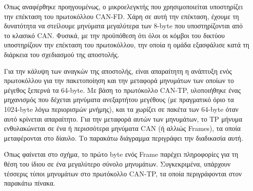 \documentclass[a4paper,nobib,justified]{tufte-book}
\begin{document}
Όπως αναφέρθηκε προηγουμένως, ο μικροελεγκτής που χρησιμοποιείται υποστηρίζει την επέκταση του πρωτοκόλλου CAN-FD. Χάρη σε αυτή την επέκταση, έχουμε τη δυνατότητα να στείλουμε μηνύματα μεγαλύτερα των 8-byte που υποστηρίζονται από το κλασικό CAN. Φυσικά, με την προϋπόθεση ότι όλοι οι κόμβοι του δικτύου υποστηρίζουν την επέκταση του πρωτοκόλλου, την οποία η ομάδα εξασφάλισε κατά τη διάρκεια του σχεδιασμού της αποστολής.

Για την κάλυψη των αναγκών της αποστολής, είναι απαραίτητη η ανάπτυξη ενός πρωτοκόλλου για την πακετοποίηση και την μεταφορά μηνυμάτων των οποίων το μέγεθος ξεπερνά τα 64-byte. Με βάση το πρωτόκολλο CAN-TP, υλοποιήθηκε ένας μηχανισμός που δέχεται μηνύματα ανεξαρτήτου μεγέθους (με πραγματικό όριο τα 1024-byte λόγω περιορισμών μνήμης), και τα χωρίζει σε πακέτα των 64-byte όταν αυτό κρίνεται απαραίτητο. Για την μεταφορά αυτών των μηνυμάτων, το TP μήνυμα ενθυλακώνεται σε ένα ή περισσότερα μηνύματα CAN (ή αλλιώς Frames), τα οποία μεταφέρονται στο δίαυλο. Το παρακάτω διάγραμμα περιγράφει την διαδικασία αυτή. 


Όπως φαίνεται στο σχήμα, το πρώτο byte ενός Frame παρέχει πληροφορίες για τη θέση του ίδιου σε ένα μεγαλύτερο σύνολο μηνυμάτων. Συγκεκριμένα, υπάρχουν τέσσερις τύποι μηνυμάτων στο πρωτόκολλο CAN-TP, τα οποία περιγράφονται στον παρακάτω πίνακα.
\end{document}
